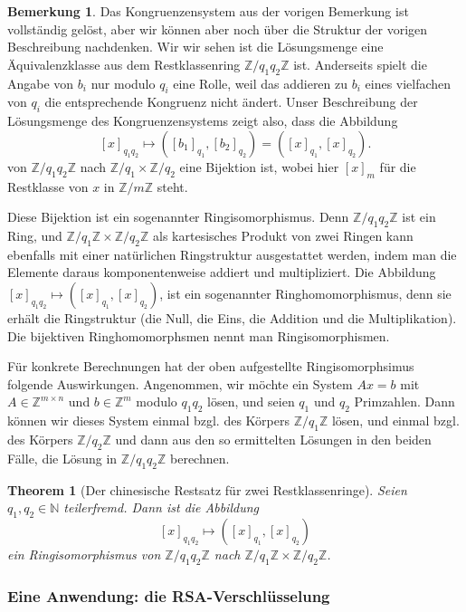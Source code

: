 \documentclass[
a4paper,landscape,16pt,
bibliography=totocnumbered,
numbers=noenddot,
]{scrartcl}
\numberwithin{equation}{subsection}
\newcommand{\N}{\mathbb N}
\newcommand{\Z}{\mathbb Z}
\theoremstyle{plain}
\newtheorem*{thm}{Theorem}
\theoremstyle{definition}
\newtheorem*{bem}{Bemerkung}
\begin{document}
\begin{bem}
	Das Kongruenzensystem aus der vorigen Bemerkung ist vollständig gelöst, aber wir können aber noch über die Struktur der vorigen Beschreibung nachdenken. 
	Wir wir sehen ist die Lösungsmenge eine Äquivalenzklasse aus dem Restklassenring $\Z/ q_1 q_2 \Z$ ist. Anderseits spielt die Angabe von $b_i$ nur modulo $q_i$ eine Rolle, weil das addieren zu $b_i$ eines vielfachen von $q_i$ die entsprechende Kongruenz nicht ändert. Unser Beschreibung der Lösungsmenge des Kongruenzensystems zeigt also, dass die Abbildung 
	\[
	[x]_{q_1 q_2} \mapsto ([b_1]_{q_1}, [b_2]_{q_2}) = ([x]_{q_1},[x]_{q_2}). 
	\]
	von $\Z / q_1 q_2 \Z$ nach $\Z / q_1 \times \Z/ q_2$ eine Bijektion ist, wobei hier $[x]_m$ für die Restklasse von $x$ in $\Z/ m \Z$ steht. 
	
	Diese Bijektion ist ein sogenannter Ringisomorphismus. Denn $\Z / q_1q_2 \Z$ ist ein Ring, und $\Z  / q_1 \Z \times \Z / q_2 \Z$ als kartesisches Produkt von zwei Ringen kann ebenfalls mit einer natürlichen Ringstruktur ausgestattet werden, indem man die Elemente daraus komponentenweise addiert und multipliziert. Die Abbildung $[x]_{q_1 q_2} \mapsto ([x]_{q_1} , [x]_{q_2})$, ist ein sogenannter Ringhomomorphismus, denn sie erhält die Ringstruktur (die Null, die Eins, die Addition und die Multiplikation). Die bijektiven Ringhomomorphsmen nennt man Ringisomorphismen. 
	
	Für konkrete Berechnungen hat der oben aufgestellte Ringisomorphsimus folgende Auswirkungen. Angenommen, wir möchte ein System $A x =b$ mit $A \in \Z^{m \times n}$ und $b \in \Z^m$ modulo $q_1 q_2$ lösen, und seien $q_1$ und $q_2$ Primzahlen. Dann können wir dieses System einmal bzgl. des Körpers $ \Z / q_1 \Z$ lösen, und einmal bzgl. des Körpers $\Z / q_2 \Z$ und dann aus den so ermittelten Lösungen in den beiden Fälle, die Lösung in $\Z / q_1 q_2 \Z$ berechnen. 
\end{bem} 


\begin{thm}[Der chinesische Restsatz für zwei Restklassenringe] 
	Seien $q_1, q_2 \in \N$ teilerfremd. Dann ist die Abbildung 
	\[
			[x]_{q_1 q_2} \mapsto ([x]_{q_1}, [x]_{q_2})
	\]
	ein Ringisomorphismus von $\Z / q_1 q_2 \Z$ nach $\Z / q_1 \Z \times \Z / q_2 \Z$. 
\end{thm}

\subsubsection{Eine Anwendung: die RSA-Verschlüsselung}
\end{document}
